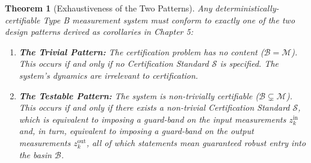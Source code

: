 \documentclass[12pt]{article}
\theoremstyle{definition}
\theoremstyle{plain}
\newtheorem{theorem}{Theorem}[section]
\begin{document}
\begin{theorem}[Exhaustiveness of the Two Patterns]
Any deterministically-certifiable Type B measurement system must conform to exactly one of the two design patterns derived as corollaries in Chapter 5:
\begin{enumerate}
    \item \textbf{The Trivial Pattern:} The certification problem has no content ($\mathcal{B}=\mathcal{M}$). This occurs if and only if no Certification Standard $\mathcal{S}$ is specified. The system's dynamics are irrelevant to certification.
    \item \textbf{The Testable Pattern:} The system is non-trivially certifiable ($\mathcal{B} \subsetneq \mathcal{M}$). This occurs if and only if there exists a non-trivial Certification Standard $\mathcal{S}$, which is equivalent to imposing a guard-band on the input measurements $z^{\text{in}}_k$ and, in turn, equivalent to imposing a guard-band on the output measurements $z^{\text{out}}_k$, all of which statements mean guaranteed robust entry into the basin $\mathcal{B}$.
\end{enumerate}
\end{theorem}
\end{document}
